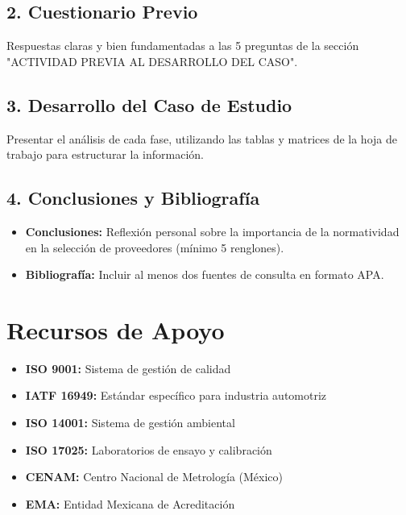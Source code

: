 \documentclass{article}
\begin{document}
\subsection*{2. Cuestionario Previo}
Respuestas claras y bien fundamentadas a las 5 preguntas de la sección "ACTIVIDAD PREVIA AL DESARROLLO DEL CASO".

\subsection*{3. Desarrollo del Caso de Estudio}
Presentar el análisis de cada fase, utilizando las tablas y matrices de la hoja de trabajo para estructurar la información.

\subsection*{4. Conclusiones y Bibliografía}
\begin{itemize}
    \item \textbf{Conclusiones:} Reflexión personal sobre la importancia de la normatividad en la selección de proveedores (mínimo 5 renglones).
    \item \textbf{Bibliografía:} Incluir al menos dos fuentes de consulta en formato APA.
\end{itemize}

\section*{Recursos de Apoyo}

\begin{itemize}
    \item \textbf{ISO 9001:} Sistema de gestión de calidad
    \item \textbf{IATF 16949:} Estándar específico para industria automotriz
    \item \textbf{ISO 14001:} Sistema de gestión ambiental
    \item \textbf{ISO 17025:} Laboratorios de ensayo y calibración
    \item \textbf{CENAM:} Centro Nacional de Metrología (México)
    \item \textbf{EMA:} Entidad Mexicana de Acreditación
\end{itemize}
\end{document}

